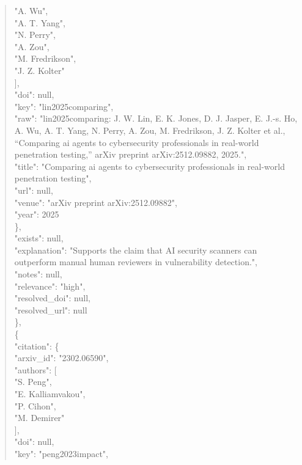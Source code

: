 \documentclass[11pt]{article}
\begin{document}
\begin{quote}
          "A. Wu",\\
          "A. T. Yang",\\
          "N. Perry",\\
          "A. Zou",\\
          "M. Fredrikson",\\
          "J. Z. Kolter"\\
        ],\\
        "doi": null,\\
        "key": "lin2025comparing",\\
        "raw": "lin2025comparing: J. W. Lin, E. K. Jones, D. J. Jasper, E. J.-s. Ho, A. Wu, A. T. Yang, N. Perry, A. Zou, M. Fredrikson, J. Z. Kolter et al., ``Comparing ai agents to cybersecurity professionals in real-world penetration testing,'' arXiv preprint arXiv:2512.09882, 2025.",\\
        "title": "Comparing ai agents to cybersecurity professionals in real-world penetration testing",\\
        "url": null,\\
        "venue": "arXiv preprint arXiv:2512.09882",\\
        "year": 2025\\
      \},\\
      "exists": null,\\
      "explanation": "Supports the claim that AI security scanners can outperform manual human reviewers in vulnerability detection.",\\
      "notes": null,\\
      "relevance": "high",\\
      "resolved\_doi": null,\\
      "resolved\_url": null\\
    \},\\
    \{\\
      "citation": \{\\
        "arxiv\_id": "2302.06590",\\
        "authors": [\\
          "S. Peng",\\
          "E. Kalliamvakou",\\
          "P. Cihon",\\
          "M. Demirer"\\
        ],\\
        "doi": null,\\
        "key": "peng2023impact",\\

\end{quote}
\end{document}
